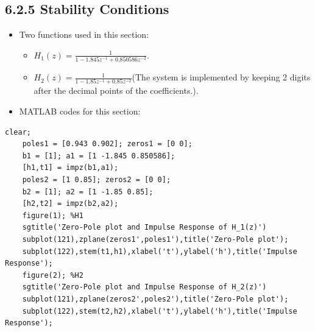 \documentclass[onecolumn,oneside]{SUSTechHomework}
\begin{document}
\subsection*{6.2.5 Stability Conditions}
\begin{itemize}
    \item Two functions used in this section:
    \begin{itemize}
        \item $H_1(z)=\frac{1}{1-1.845 z^{-1}+0.850586 z^{-2}}$.
        \item $H_2(z)=\frac{1}{1-1.85 z^{-1}+0.85 z^{-2}}$(The system is implemented by keeping 2 digits after
        the decimal points of the coefficients.).
    \end{itemize}
    \item MATLAB codes for this section:
\end{itemize}
\begin{lstlisting}[title=\textbf{q6\_2\_5.m}]
    clear;
    poles1 = [0.943 0.902]; zeros1 = [0 0];
    b1 = [1]; a1 = [1 -1.845 0.850586];
    [h1,t1] = impz(b1,a1);
    poles2 = [1 0.85]; zeros2 = [0 0];
    b2 = [1]; a2 = [1 -1.85 0.85];
    [h2,t2] = impz(b2,a2);
    figure(1); %H1
    sgtitle('Zero-Pole plot and Impulse Response of H_1(z)')
    subplot(121),zplane(zeros1',poles1'),title('Zero-Pole plot');
    subplot(122),stem(t1,h1),xlabel('t'),ylabel('h'),title('Impulse Response');
    figure(2); %H2
    sgtitle('Zero-Pole plot and Impulse Response of H_2(z)')
    subplot(121),zplane(zeros2',poles2'),title('Zero-Pole plot');
    subplot(122),stem(t2,h2),xlabel('t'),ylabel('h'),title('Impulse Response');     
\end{lstlisting}
\end{document}
